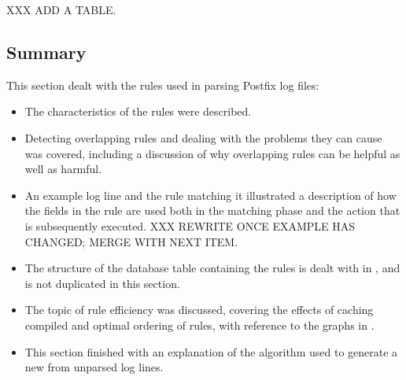 XXX ADD A TABLE\@.

\subsection{Summary}

This section dealt with the rules used in parsing Postfix log files:

\begin{itemize}

    \item The characteristics of the rules were described.

    \item Detecting overlapping rules and dealing with the problems they
        can cause was covered, including a discussion of why overlapping
        rules can be helpful as well as harmful.

    \item An example log line and the rule matching it illustrated a
        description of how the fields in the rule are used both in the
        matching phase and the action that is subsequently executed.  XXX
        REWRITE ONCE EXAMPLE HAS CHANGED\@; MERGE WITH NEXT ITEM\@.

    \item The structure of the database table containing the rules is dealt
        with in , and is not duplicated in this
        section.

    \item The topic of rule efficiency was discussed, covering the effects
        of caching compiled \regexes{} and optimal ordering of rules, with
        reference to the graphs in .

    \item This section finished with an explanation of the algorithm used
        to generate a new \regex{} from unparsed log lines.

\end{itemize}

